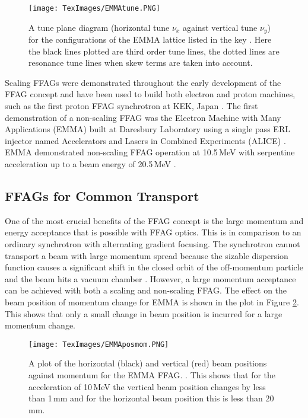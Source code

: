 \documentclass[11pt]{article}
\begin{document}
\begin{figure}[H]
\centering
\texttt{[image: TexImages/EMMAtune.PNG]}
\caption{\label{fig:scottEMMAlattice} A tune plane diagram (horizontal tune $\nu_{x}$ against vertical tune $\nu_{y}$) for the configurations of the EMMA lattice listed in the key \cite{scottEMMAlattice}. Here the black lines plotted are third order tune lines, the dotted lines are resonance tune lines when skew terms are taken into account.}
\end{figure}

Scaling FFAGs were demonstrated throughout the early development of the FFAG concept and have been used to build both electron and proton machines, such as the first proton FFAG synchrotron at KEK, Japan \cite{KEKprotonFFAG}. The first demonstration of a non-scaling FFAG was the Electron Machine with Many Applications (EMMA) built at Daresbury Laboratory using a single pass ERL injector named Accelerators and Lasers in Combined Experiments (ALICE) \cite{EMMApac}. EMMA demonstrated non-scaling FFAG operation at 10.5\,MeV with serpentine acceleration up to a beam energy of 20.5\,MeV \cite{EMMAnature}.  

\subsection{FFAGs for Common Transport}
\label{sec:FFAGCT}

One of the most crucial benefits of the FFAG concept is the large momentum and energy acceptance that is possible with FFAG optics. This is in comparison to an ordinary synchrotron with alternating gradient focusing. The synchrotron cannot transport a beam with large momentum spread because the sizable dispersion function causes a significant shift in the closed orbit of the off-momentum particle and the beam hits a vacuum chamber \cite{SMachidaGantry}. However, a large momentum acceptance can be achieved with both a scaling and non-scaling FFAG. The effect on the beam position of momentum change for EMMA is shown in the plot in Figure \ref{fig:EMMAposmom}. This shows that only a small change in beam position is incurred for a large momentum change.

\begin{figure}[H]
\centering
\texttt{[image: TexImages/EMMAposmom.PNG]}
\caption{\label{fig:EMMAposmom} A plot of the horizontal (black) and vertical (red) beam positions against momentum for the EMMA FFAG. \cite{EMMAnature}. This shows that for the acceleration of 10\,MeV the vertical beam position changes by less than 1\,mm and for the horizontal beam position this is less than 20\,mm.}
\end{figure}
\end{document}
